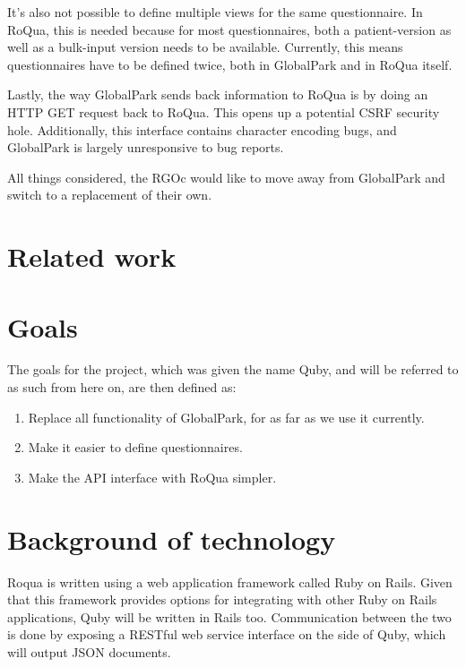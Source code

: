 \documentclass[10pt,fleqn,a4paper]{article}
\begin{document}
\begin{twocolumn}
It's also not possible to define multiple views for the same
questionnaire. In RoQua, this is needed because for most
questionnaires, both a patient-version as well as a bulk-input version
needs to be available. Currently, this means questionnaires have to be
defined twice, both in GlobalPark and in RoQua itself.

Lastly, the way GlobalPark sends back information to RoQua is by doing
an HTTP GET request back to RoQua. This opens up a potential CSRF
security hole. Additionally, this interface contains character
encoding bugs, and GlobalPark is largely unresponsive to bug reports.

All things considered, the RGOc would like to move away from
GlobalPark and switch to a replacement of their own.

\section{Related work}


\section{Goals}

The goals for the project, which was given the name Quby, and will be
referred to as such from here on, are then defined as:

\begin{enumerate}
\item Replace all functionality of GlobalPark, for as far as we use it
  currently.
\item \label{dsl} Make it easier to define questionnaires.
\item \label{restful} Make the API interface with RoQua simpler.
\end{enumerate}


\section{Background of technology}
Roqua is written using a web application framework called Ruby on Rails. Given that this framework provides options for integrating with other Ruby on Rails applications, Quby will be written in Rails too. Communication between the two is done by exposing a RESTful web service interface on the side of Quby, which will output JSON documents.



\end{twocolumn}
\end{document}
